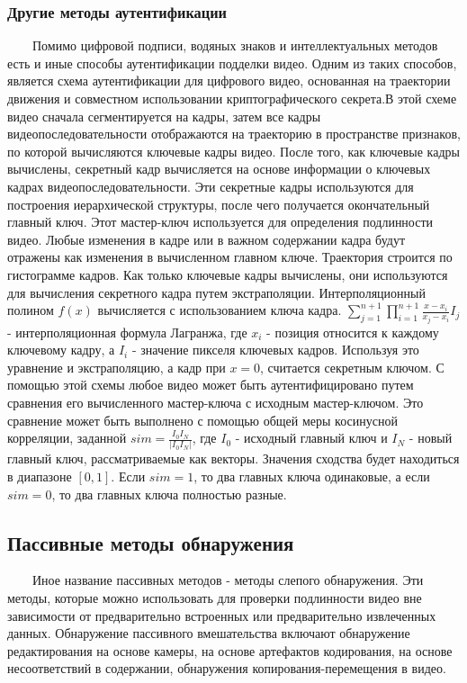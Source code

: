 \documentclass[12pt]{article}
\begin{document}
    \subsubsection{Другие методы аутентификации}
        $\qquad$Помимо цифровой подписи, водяных знаков и интеллектуальных методов есть и иные способы аутентификации подделки видео. Одним из таких способов, является схема аутентификации для цифрового видео, основанная на траектории движения и совместном использовании криптографического секрета.В этой схеме видео сначала сегментируется на кадры,
        затем все кадры видеопоследовательности отображаются на траекторию в
        пространстве признаков, по которой вычисляются ключевые
        кадры видео. После того, как ключевые кадры вычислены,
        секретный кадр вычисляется на основе информации о ключевых
        кадрах видеопоследовательности. Эти секретные кадры используются для
        построения иерархической структуры, после чего получается
        окончательный главный ключ. Этот мастер-ключ используется
        для определения подлинности видео. Любые изменения в кадре
        или в важном содержании кадра будут отражены как изменения
        в вычисленном главном ключе. Траектория строится по гистограмме кадров. Как только ключевые кадры вычислены, они используются для вычисления секретного кадра путем экстраполяции.
        Интерполяционный полином $f(x)$ вычисляется с использованием ключа кадра.
        $\displaystyle\sum_{j=1}^{n+1}\displaystyle\prod_{i=1}^{n+1}\frac{x-x_i}{x_j-x_i}I_j $
        - интерполяционная формула Лагранжа, где $x_i$ - позиция относится к каждому ключевому кадру, а $I_i$ - значение пикселя ключевых кадров. Используя это уравнение и экстраполяцию, а кадр при $x=0$, считается секретным ключом. С помощью этой схемы любое видео может быть аутентифицировано путем
        сравнения его вычисленного мастер-ключа с исходным
        мастер-ключом. Это сравнение может быть выполнено с помощью
        общей меры косинусной корреляции, заданной $sim = \frac{I_0 I_N}{|I_0 I_N|}$, где $I_0$ - исходный главный ключ и $I_N$ - новый главный ключ, рассматриваемые как векторы. Значения сходства будет находиться в диапазоне $[0,1]$. Если $sim = 1$, то два главных ключа одинаковые, а если $sim = 0$, то два главных ключа полностью разные.
    \subsection{Пассивные методы обнаружения}
        $\qquad$Иное название пассивных методов - методы слепого обнаружения. Эти методы, которые можно использовать для проверки подлинности видео вне зависимости от предварительно встроенных или предварительно извлеченных данных. Обнаружение пассивного вмешательства включают обнаружение редактирования на основе камеры, на основе артефактов кодирования, на основе несоответствий в содержании, обнаружения копирования-перемещения в видео.
\end{document}
